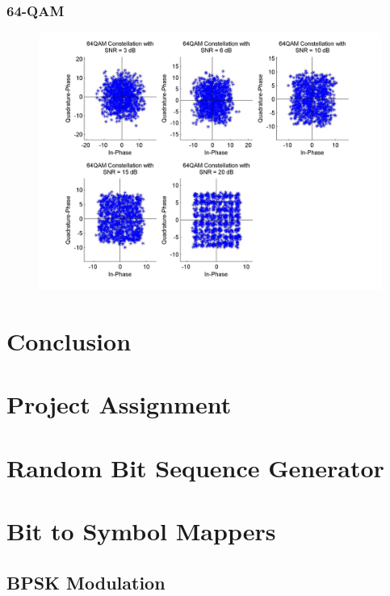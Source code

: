 \documentclass[]{article}
\begin{document}
\subsubsection{64-QAM}
\begin{figure}[H]
\centering
\includegraphics[width=\textwidth]{qam64Const.jpg}
\caption{}
\end{figure}

\section{Conclusion}

\appendix
\newpage
\section{Project Assignment}
\label{app:assign}

\cleardoublepage
\newpage


\section{Random Bit Sequence Generator}
\label{app:random_bit_generator}

\cleardoublepage
\newpage

\section{Bit to Symbol Mappers}
\label{app:bittosym}
\subsection{BPSK Modulation }
\label{app:bpsk_mod}
%
\end{document}
